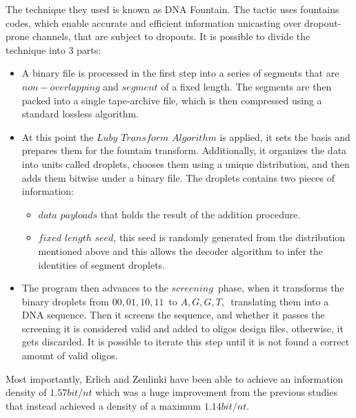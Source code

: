 \documentclass[10pt,twocolumn,twoside]{gsajnl}
\theoremstyle{definition}
\begin{document}
The technique they used is known as DNA Fountain. 
The tactic uses fountains codes, which enable accurate and efficient information unicasting over dropout-prone channels, that are subject to dropouts. It is possible to divide the technique into 3 parts:
\begin{itemize}
    \item A binary file is processed in the first step into a series of segments that are $non-overlapping$ and $segment$ of a fixed length. The segments are then packed into a single tape-archive file, which is then compressed using a standard lossless algorithm.
    
    \item At this point the $Luby$ $Transform$ $Algorithm$ is applied, it sets the basis and prepares them for the fountain transform. Additionally, it organizes the data into units called droplets, chooses them using a unique distribution, and then adds them bitwise under a binary file.
    The droplets contains two pieces of information:
    
    \begin{itemize}
        \item $data$ $payloads$ that holds the result of the addition procedure.
        
        \item $fixed$ $length$ $seed$, this seed is randomly generated from the distribution mentioned above and this allows the decoder algorithm to infer the identities of segment droplets.
    \end{itemize}
    
    \item The program then advances to the $screening$ phase, when it transforms the binary droplets from ${00, 01, 10, 11}$ to ${A, G, G, T,}$ translating them into a DNA sequence. Then it screens the sequence, and whether it passes the screening it is considered valid and added to oligos design files, otherwise, it gets discarded.
    It is possible to iterate this step until it is not found a correct amount of valid oligos. 
\end{itemize}
Most importantly, Erlich and Zenlinki have been able to achieve an information density of $1.57bit/nt$ which was a huge improvement from the previous studies that instead achieved a density of a maximum $1.14bit/nt$.
\end{document}
